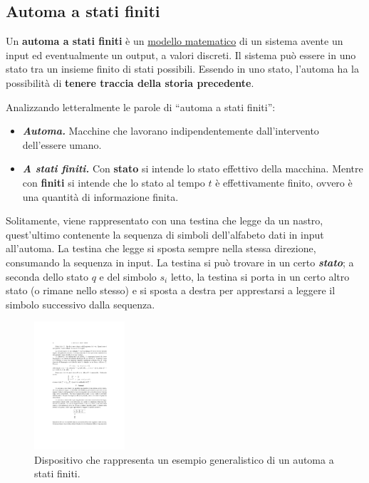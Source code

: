 \documentclass[a4paper]{article}
\begin{document}
	\subsection{Automa a stati finiti}
	
	Un \textbf{automa a stati finiti} è un \underline{modello matematico} di un sistema avente un input ed eventualmente un output, a valori discreti. Il sistema può essere in uno stato tra un insieme finito di stati possibili. Essendo in uno stato, l'automa ha la possibilità di \textbf{tenere traccia della storia precedente}.
	
	\noindent
	Analizzando letteralmente le parole di ``automa a stati finiti'':
	
	\begin{itemize}
		\item[\ding{46}] \textbf{\emph{Automa.}} Macchine che lavorano indipendentemente dall'intervento dell'essere umano.
		
		\item[\ding{46}] \textbf{\emph{A stati finiti.}} Con \textbf{stato} si intende lo stato effettivo della macchina. Mentre con \textbf{finiti} si intende che lo stato al tempo $t$ è effettivamente finito, ovvero è una quantità di informazione finita.
	\end{itemize}
	
	Solitamente, viene rappresentato con una testina che legge da un nastro, quest'ultimo contenente la sequenza di simboli dell'alfabeto dati in input all'automa. La testina che legge si sposta sempre nella stessa direzione, consumando la sequenza in input. La testina si può trovare in un certo \textbf{\emph{stato}}; a seconda dello stato $q$ e del simbolo $s_i$ letto, la testina si porta in un certo altro stato (o rimane nello stesso) e si sposta a destra per apprestarsi a leggere il simbolo successivo dalla sequenza.
	
	\begin{figure}[!htp]
		\centering
		\includegraphics[width=0.3\textwidth]{img/automa_generale.pdf}
		\caption{Dispositivo che rappresenta un esempio generalistico di un automa a stati finiti.}
	\end{figure}
\end{document}
